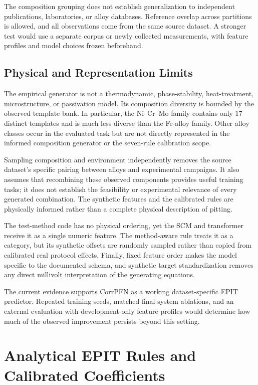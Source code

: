 \documentclass{article}
\begin{document}
The composition grouping does not establish generalization to independent
publications, laboratories, or alloy databases. Reference overlap across
partitions is allowed, and all observations come from the same source
dataset. A stronger test would use a separate corpus or newly collected
measurements, with feature profiles and model choices frozen beforehand.

\subsection{Physical and Representation Limits}

The empirical generator is not a thermodynamic, phase-stability,
heat-treatment, microstructure, or passivation model. Its composition
diversity is bounded by the observed template bank. In particular, the
Ni--Cr--Mo family contains only \(17\) distinct templates and is much less
diverse than the Fe-alloy family. Other alloy classes occur in the evaluated
task but are not directly represented in the informed composition generator
or the seven-rule calibration scope.

Sampling composition and environment independently removes the source
dataset's specific pairing between alloys and experimental campaigns. It
also assumes that recombining these observed components provides useful
training tasks; it does not establish the feasibility or experimental
relevance of every generated combination. The synthetic features and the
calibrated rules are physically informed rather than a complete physical
description of pitting.

The test-method code has no physical ordering, yet the SCM and transformer
receive it as a single numeric feature. The method-aware rule treats it as a
category, but its synthetic offsets are randomly sampled rather than copied
from calibrated real protocol effects. Finally, fixed feature order makes the
model specific to the documented schema, and synthetic target standardization
removes any direct millivolt interpretation of the generating equations.

The current evidence supports CorrPFN as a working dataset-specific EPIT
predictor. Repeated training seeds, matched final-system ablations, and an
external evaluation with development-only feature profiles would determine
how much of the observed improvement persists beyond this setting.

\appendix

\section{Analytical EPIT Rules and Calibrated Coefficients}
\label{app:target-rules}
\end{document}
